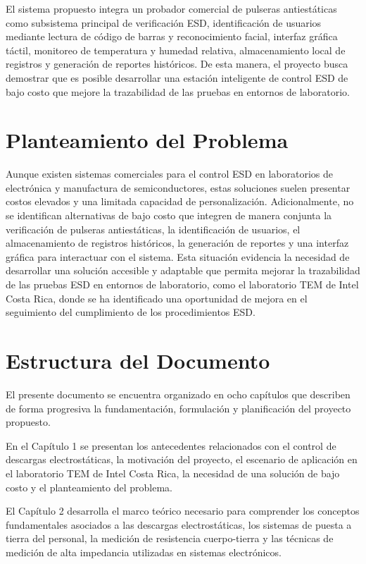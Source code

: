El sistema propuesto integra un probador comercial de pulseras antiestáticas como
subsistema principal de verificación ESD, identificación de usuarios mediante lectura de
código de barras y reconocimiento facial, interfaz gráfica táctil, monitoreo de temperatura
y humedad relativa, almacenamiento local de registros y generación de reportes históricos.
De esta manera, el proyecto busca demostrar que es posible desarrollar una estación inteligente
de control ESD de bajo costo que mejore la trazabilidad de las pruebas en
entornos de laboratorio.

\section{Planteamiento del Problema}

Aunque existen sistemas comerciales para el control ESD en laboratorios de electrónica y
manufactura de semiconductores, estas soluciones suelen presentar costos elevados y una
limitada capacidad de personalización. Adicionalmente, no se identifican alternativas de
bajo costo que integren de manera conjunta la verificación de pulseras antiestáticas, la
identificación de usuarios, el almacenamiento de registros históricos, la generación de
reportes y una interfaz gráfica para interactuar con el sistema. Esta situación evidencia
la necesidad de desarrollar una solución accesible y adaptable que permita mejorar la
trazabilidad de las pruebas ESD en entornos de laboratorio, como el laboratorio TEM
de Intel Costa Rica, donde se ha identificado una oportunidad de mejora en el seguimiento
del cumplimiento de los procedimientos ESD.

\section{Estructura del Documento}

El presente documento se encuentra organizado en ocho capítulos que describen de forma
progresiva la fundamentación, formulación y planificación del proyecto propuesto.

En el Capítulo 1 se presentan los antecedentes relacionados con el control de descargas
electrostáticas, la motivación del proyecto, el escenario de aplicación en el laboratorio
TEM de Intel Costa Rica, la necesidad de una solución de bajo costo y el planteamiento
del problema.

El Capítulo 2 desarrolla el marco teórico necesario para comprender los conceptos
fundamentales asociados a las descargas electrostáticas, los sistemas de puesta a tierra
del personal, la medición de resistencia cuerpo-tierra y las técnicas de medición de alta
impedancia utilizadas en sistemas electrónicos.

